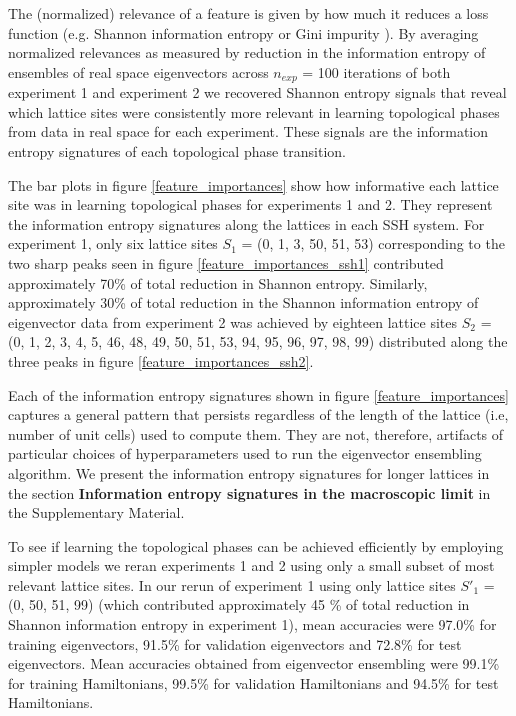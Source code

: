 \documentclass[fleqn,10pt]{wlscirep}
\begin{document}
The (normalized) relevance of a feature is given by how much it reduces a loss function (e.g. Shannon information entropy or Gini impurity \cite{friedman2001elements}). By averaging normalized relevances as measured by reduction in the information entropy of ensembles of real space eigenvectors across $n_{exp}$ = 100 iterations of both experiment 1 and experiment 2 we recovered Shannon entropy signals that reveal which lattice sites were consistently more relevant in learning topological phases from data in real space for each experiment. These signals are the information entropy signatures of each topological phase transition. 

The bar plots in figure \ref{feature_importances} show how informative each lattice site was in learning topological phases for experiments 1 and 2. They represent the information entropy signatures along the lattices in each SSH system. For experiment 1, only six lattice sites $S_1$ = (0, 1, 3, 50, 51, 53) corresponding to the two sharp peaks seen in figure \ref{feature_importances_ssh1} contributed approximately 70\% of total reduction in Shannon entropy. Similarly, approximately 30\% of total reduction in the Shannon information entropy of eigenvector data from experiment 2 was achieved by eighteen lattice sites $S_2$ = (0, 1, 2, 3, 4, 5, 46, 48, 49, 50, 51, 53, 94, 95, 96, 97, 98, 99) distributed along the three peaks in figure \ref{feature_importances_ssh2}.

Each of the information entropy signatures shown in figure \ref{feature_importances} captures a general pattern that persists regardless of the length of the lattice (i.e, number of unit cells) used to compute them. They are not, therefore, artifacts of particular choices of hyperparameters used to run the eigenvector ensembling algorithm. We present the information entropy signatures for longer lattices in the section \textbf{Information entropy signatures in the macroscopic limit} in the Supplementary Material.

To see if learning the topological phases can be achieved efficiently by employing simpler models we reran experiments 1 and 2 using only a small subset of most relevant lattice sites. In our rerun of experiment 1 using only lattice sites $S'_1$ = (0, 50, 51, 99) (which contributed approximately 45 \% of total reduction in Shannon information entropy in experiment 1), mean accuracies were 97.0\% for training eigenvectors, 91.5\% for validation eigenvectors and 72.8\% for test eigenvectors. Mean accuracies obtained from eigenvector ensembling were 99.1\% for training Hamiltonians, 99.5\% for validation Hamiltonians and 94.5\% for test Hamiltonians.
\end{document}
